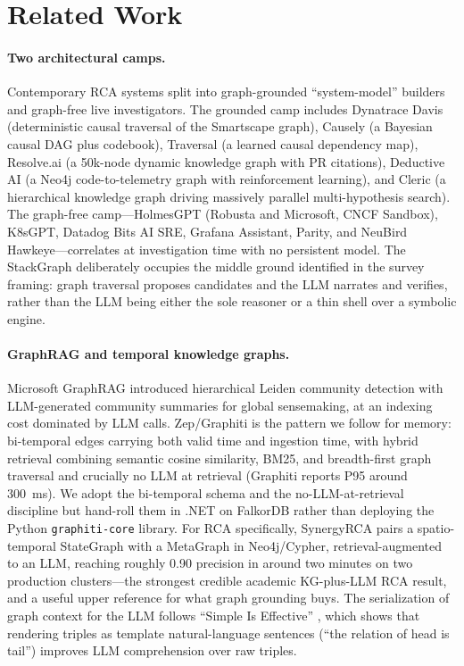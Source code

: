 \documentclass[11pt]{article}
\begin{document}
\section{Related Work}

\paragraph{Two architectural camps.}
Contemporary RCA systems split into graph-grounded ``system-model'' builders and
graph-free live investigators. The grounded camp includes Dynatrace Davis
(deterministic causal traversal of the Smartscape graph), Causely (a Bayesian
causal DAG plus codebook), Traversal (a learned causal dependency map),
Resolve.ai (a 50k-node dynamic knowledge graph with PR citations), Deductive AI
(a Neo4j code-to-telemetry graph with reinforcement learning), and Cleric (a
hierarchical knowledge graph driving massively parallel multi-hypothesis search).
The graph-free camp---HolmesGPT (Robusta and Microsoft, CNCF Sandbox), K8sGPT,
Datadog Bits AI SRE, Grafana Assistant, Parity, and NeuBird Hawkeye---correlates
at investigation time with no persistent model. The StackGraph deliberately
occupies the middle ground identified in the survey framing: graph traversal
proposes candidates and the LLM narrates and verifies, rather than the LLM being
either the sole reasoner or a thin shell over a symbolic engine.

\paragraph{GraphRAG and temporal knowledge graphs.}
Microsoft GraphRAG \citep{edge2024graphrag} introduced hierarchical Leiden
community detection with LLM-generated community summaries for global sensemaking,
at an indexing cost dominated by LLM calls. Zep/Graphiti
\citep{rasmussen2025zep} is the pattern we follow for memory: bi-temporal edges
carrying both valid time and ingestion time, with hybrid retrieval combining
semantic cosine similarity, BM25, and breadth-first graph traversal and crucially
no LLM at retrieval (Graphiti reports P95 around 300~ms). We adopt the
bi-temporal schema and the no-LLM-at-retrieval discipline but hand-roll them in
.NET on FalkorDB rather than deploying the Python \texttt{graphiti-core} library.
For RCA specifically, SynergyRCA \citep{liu2025synergyrca} pairs a
spatio-temporal StateGraph with a MetaGraph in Neo4j/Cypher, retrieval-augmented
to an LLM, reaching roughly 0.90 precision in around two minutes on two
production clusters---the strongest credible academic KG-plus-LLM RCA result, and
a useful upper reference for what graph grounding buys. The serialization of
graph context for the LLM follows ``Simple Is Effective'' \citep{li2024simple},
which shows that rendering triples as template natural-language sentences (``the
relation of head is tail'') improves LLM comprehension over raw triples.
\end{document}
